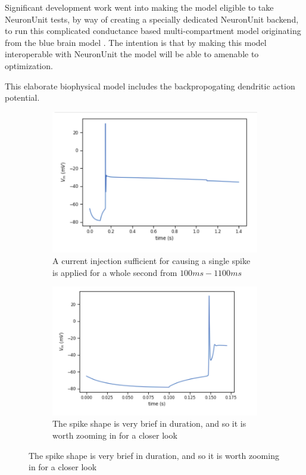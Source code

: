Significant development work went into making the model eligible to take NeuronUnit tests, by way of creating a specially dedicated NeuronUnit backend, to run this complicated conductance based multi-compartment model originating from the blue brain model \cite{markram2015reconstruction}. The intention is that by making this model interoperable with NeuronUnit the model will be able to amenable to optimization.

This elaborate biophysical model includes the backpropogating dendritic action potential.
\url{}



\begin{figure}
\begin{center}


\centering
\begin{subfigure}{.2}
  \centering
    \includegraphics[scale=0.5]{figures/correct_active_l5pc.png}
    \caption{A current injection sufficient for causing a single spike is applied for a whole second from $100ms-1100ms$}
  \label{fig:sub1}
\end{subfigure}

\centering
\begin{subfigure}{.2}
  \centering
    \includegraphics[scale=0.5]{figures/spike_shape.png}
    \caption{The spike shape is very brief in duration, and so it is worth zooming in for a closer look}
  \label{fig:sub1}
\end{subfigure}



\end{center}
\end{figure}
